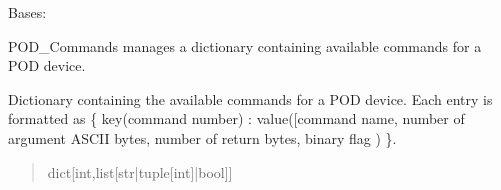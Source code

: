 \documentclass[letterpaper,10pt,english]{sphinxmanual}
\begin{document}
\begin{fulllineitems}
\label{\detokenize{PodApi.Commands:PodApi.Commands.PodCommands.CommandSet}}
\pysigstartsignatures
{}
\pysigstopsignatures
\sphinxAtStartPar
Bases: 

\sphinxAtStartPar
POD\_Commands manages a dictionary containing available commands for a POD device.

\begin{fulllineitems}
\label{\detokenize{PodApi.Commands:PodApi.Commands.PodCommands.CommandSet.__commands}}
\pysigstartsignatures
{}
\pysigstopsignatures
\sphinxAtStartPar
Dictionary containing the available commands for             a POD device. Each entry is formatted as \{ key(command number) : value({[}command name, number             of argument ASCII bytes, number of return bytes, binary flag ) \}.
\begin{quote}\begin{description}
\sphinxAtStartPar
dict{[}int,list{[}str|tuple{[}int{]}|bool{]}{]}

\end{description}\end{quote}

\end{fulllineitems}



\end{fulllineitems}
\end{document}
